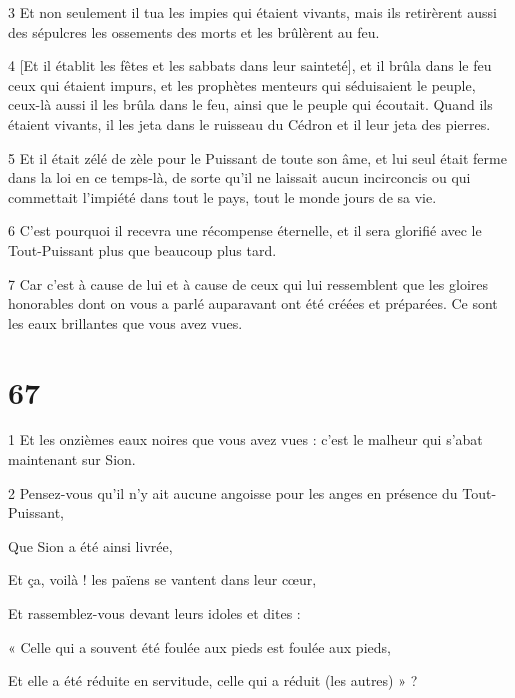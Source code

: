 \par 3 Et non seulement il tua les impies qui étaient vivants, mais ils retirèrent aussi des sépulcres les ossements des morts et les brûlèrent au feu.

\par 4 [Et il établit les fêtes et les sabbats dans leur sainteté], et il brûla dans le feu ceux qui étaient impurs, et les prophètes menteurs qui séduisaient le peuple, ceux-là aussi il les brûla dans le feu, ainsi que le peuple qui écoutait. Quand ils étaient vivants, il les jeta dans le ruisseau du Cédron et il leur jeta des pierres.

\par 5 Et il était zélé de zèle pour le Puissant de toute son âme, et lui seul était ferme dans la loi en ce temps-là, de sorte qu'il ne laissait aucun incirconcis ou qui commettait l'impiété dans tout le pays, tout le monde jours de sa vie.

\par 6 C'est pourquoi il recevra une récompense éternelle, et il sera glorifié avec le Tout-Puissant plus que beaucoup plus tard.

\par 7 Car c'est à cause de lui et à cause de ceux qui lui ressemblent que les gloires honorables dont on vous a parlé auparavant ont été créées et préparées. Ce sont les eaux brillantes que vous avez vues.

\chapter{67}

\par 1 Et les onzièmes eaux noires que vous avez vues : c'est le malheur qui s'abat maintenant sur Sion.

\par 2 Pensez-vous qu'il n'y ait aucune angoisse pour les anges en présence du Tout-Puissant,

\par Que Sion a été ainsi livrée,

\par Et ça, voilà ! les païens se vantent dans leur cœur,

\par Et rassemblez-vous devant leurs idoles et dites :

\par « Celle qui a souvent été foulée aux pieds est foulée aux pieds,

\par Et elle a été réduite en servitude, celle qui a réduit (les autres) » ?

